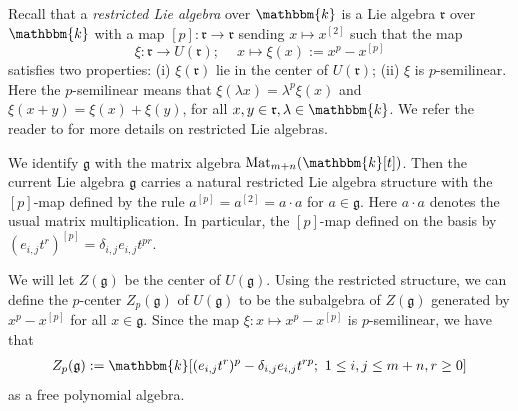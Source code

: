 \documentclass[12pt,reqno]{amsart}
\newcommand{\fg}{\mathfrak{g}}
\newcommand{\kk}{\mathbbm{k}}
\newcommand{\fr}{\mathfrak{r}}
\DeclareMathOperator{\Mat}{Mat}
\numberwithin{equation}{section}
\theoremstyle{Theorem}
\theoremstyle{remark}
\numberwithin{equation}{section}
\begin{document}
Recall that a {\it restricted Lie algebra} over $\kk$ is a Lie algebra $\mathfrak{r}$
over $\kk$ with a map $[p]:\fr\rightarrow \fr$ sending $x\mapsto x^{[2]}$ such that the map
\[
\xi:\fr\rightarrow U(\fr);~\quad x\mapsto \xi(x):=x^p-x^{[p]}
\]
satisfies two properties:
(i) $\xi(\fr)$ lie in the center of $U(\fr)$;
(ii) $\xi$ is $p$-semilinear.
Here the $p$-semilinear means that $\xi(\lambda x)=\lambda^p\xi(x)$ and
$\xi(x+y)=\xi(x)+\xi(y)$, for all $x,y\in\fr, \lambda\in\kk$.
We refer the reader to \cite[Section 2]{Jan98} for more details on restricted Lie algebras.

We identify $\fg$ with the matrix algebra $\Mat_{m+n}(\kk[t])$.
Then the current Lie algebra $\fg$ carries a natural restricted Lie algebra structure
with the $[p]$-map defined by the rule $a^{[p]}=a^{[2]}=a\cdot a$ for $a\in \fg$.
Here $a\cdot a$ denotes the usual matrix multiplication.
In particular, the $[p]$-map defined on the basis by $(e_{i,j}t^r)^{[p]}=\delta_{i,j}e_{i,j}t^{pr}$.

We will let $Z(\fg)$ be the center of $U(\fg)$.
Using the restricted structure,
we can define the $p$-center $Z_p(\fg)$ of $U(\fg)$ to be the subalgebra of
$Z(\fg)$ generated by $x^p-x^{[p]}$ for all $x\in\fg$. 
Since the map $\xi:x\mapsto x^p-x^{[p]}$ is $p$-semilinear,
we have that
\begin{align}\label{zpg}
 Z_p(\fg):=\kk[(e_{i,j}t^r)^p-\delta_{i,j}e_{i,j}t^{rp};~1\leq i,j\leq m+n, r\geq 0]   
\end{align}
as a free polynomial algebra.
\end{document}
